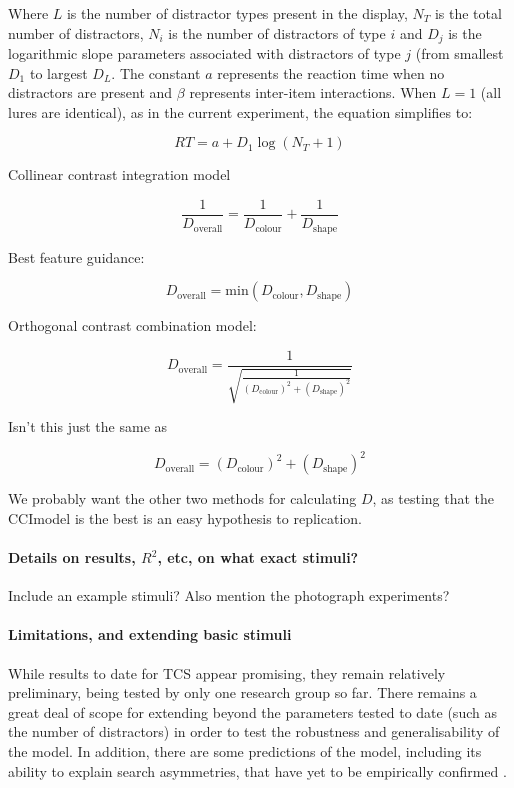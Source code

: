 \documentclass[smallextended]{svjour3}       %
\begin{document}
Where $L$ is the number of distractor types present in the display, $N_T$ is the total number of distractors, $N_i$ is the number of distractors of type $i$ and $D_j$ is the logarithmic slope parameters associated with distractors of type $j$ (from smallest $D_1$ to largest $D_L$. The constant $a$ represents the reaction time when no distractors are present and $\beta$ represents inter-item interactions. When $L=1$ (all lures are identical), as in the current experiment, the equation simplifies to:

\begin{equation}
RT = a + D_1\log(N_T+1)
\end{equation}

Collinear contrast integration model

\begin{equation}
\frac{1}{D_\text{overall}} = \frac{1}{D_\text{colour}} + \frac{1}{D_\text{shape}}
\label{eq:collinearcontrast}
\end{equation}

Best feature guidance: 

\begin{equation}
D_\text{overall} = \text{min}\left(D_\text{colour}, D_\text{shape}\right)
\end{equation}

Orthogonal contrast combination model:

\begin{equation}
D_\text{overall} = \frac{1}{\sqrt{\frac{1}{(D_\text{colour})^2 + (D_\text{shape})^2}}}
\end{equation}

Isn't this just the same as 

\begin{equation}
D_\text{overall} = (D_\text{colour})^2 + (D_\text{shape})^2
\end{equation}

We probably want the other two methods for calculating $D$, as testing that the CCImodel is the best is an easy hypothesis to replication. 

\paragraph{Details on results, $R^2$, etc, on what exact stimuli? } Include an example stimuli? Also mention the photograph experiments? 

\paragraph{Limitations, and extending basic stimuli} While results to date for TCS appear promising, they remain relatively preliminary, being tested by only one research group so far. There remains a great deal of scope for extending beyond the parameters tested to date (such as the number of distractors) in order to test the robustness and generalisability of the model. In addition, there are some predictions of the model, including its ability to explain search asymmetries, that have yet to be empirically confirmed \cite{lleras2020target}.
\end{document}
